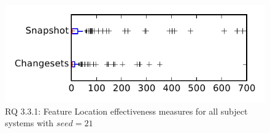 
\begin{figure}
\centering
\includegraphics[height=0.4\textheight]{figures/flt_seed/rq1_tiny_21}
\caption{RQ 3.3.1: Feature Location effectiveness measures for all subject systems with $seed=21$}
\label{fig:flt_seed:rq1:tiny}
\end{figure}
